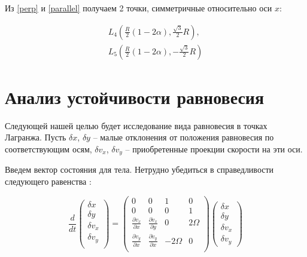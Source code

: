 \documentclass[12pt]{article}
\begin{document}
    Из \ref{perp} и \ref{parallel} получаем 2 точки, симметричные относительно 
    оси $x$:

    \begin{eqnarray}
        L_4\left(\frac{R}{2}(1 - 2\alpha), \frac{\sqrt{3}}{2}R\right),\nonumber\\
        L_5\left(\frac{R}{2}(1 - 2\alpha), -\frac{\sqrt{3}}{2}R\right)
    \end{eqnarray}

    \section{Анализ устойчивости равновесия}
    Следующей нашей целью будет исследование вида равновесия в точках Лагранжа.
    Пусть $\delta x$, $\delta y$ -- малые отклонения от положения равновесия по 
    соответствующим осям, $\delta v_x$, $\delta v_y$ -- приобретенные проекции
    скорости на эти оси.

    \par Введем вектор состояния для тела. Нетрудно убедиться в справедливости
    следующего равенства \cite{nasagov}:

    \begin{equation}
        \frac{d}{dt}
        \begin{pmatrix}
            \delta x\\
            \delta y\\
            \delta v_x\\
            \delta v_y\\
        \end{pmatrix}
        =
        \begin{pmatrix}
            0 & 0 & 1 & 0\\
            0 & 0 & 0 & 1\\
            \frac{\partial \dot{v}_x}{\partial x} & \frac{\partial \dot{v}_x}{\partial y} & 0 & 2\Omega\\
            \frac{\partial \dot{v}_y}{\partial x} & \frac{\partial \dot{v}_y}{\partial x} & -2\Omega & 0\\
        \end{pmatrix}
        \begin{pmatrix}
            \delta x\\
            \delta y\\
            \delta v_x\\
            \delta v_y
        \end{pmatrix}
        \label{magic_matrix}
    \end{equation}
\end{document}
